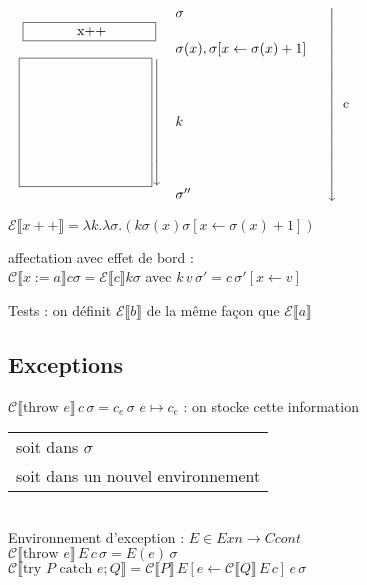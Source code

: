 \documentclass[10pt,a4paper]{article}
\newcommand{\E}{\mathcal{E}}
\newcommand{\semm}[1]{\llbracket #1 \rrbracket }
\begin{document}
\begin{ex}
 
$\left.\begin{array}{c l l}
 & \sigma & \\
 \fbox{
 \begin{minipage}{3cm}
 \centering x++
 \end{minipage}} & \\
& \sigma(x), \sigma[x \leftarrow \sigma(x)+1] & \\
\left.\fbox{
 \begin{minipage}{3cm}
\vspace{3cm} \quad
 \end{minipage}}\right\downarrow &   k& \\
& \sigma'' & \\
\end{array}\right\downarrow$ c

$\E\semm{x++} = \lambda k. \lambda \sigma . (k \sigma(x) \sigma[x \leftarrow \sigma(x) +1])$

affectation avec effet de bord :\\
$\mathcal{C}\semm{x:=a} c \sigma = \E\semm{c} k \sigma$ avec $k \, v\,  \sigma' = c \, \sigma'[x \leftarrow v]$ 
\end{ex}

Tests : on définit $\E \semm{b}$ de la même façon que  $\E \semm{a}$

\subsection{Exceptions}

$\mathcal{C} \semm{\text{throw }e}\, c \,\sigma = c_e \,\sigma$ \qquad $e \mapsto c_e$ : on stocke cette information \begin{tabular}{l}
                                                                                                     soit dans $\sigma$\\
                                                                                                     soit dans un nouvel environnement
                                                                                                    \end{tabular}\\
Environnement d'exception : $E \in Exn → Ccont$\\
$\mathcal{C}  \semm{\text{throw }e}\, E \,c \,\sigma = E(e) \, \sigma$\\
$\mathcal{C}  \semm{\text{try $P$ catch $e;Q$}} = \mathcal{C}\semm{P} \,E[e ← \mathcal{C}\semm{Q}\, E \,c] \,e \,\sigma$
\end{document}
